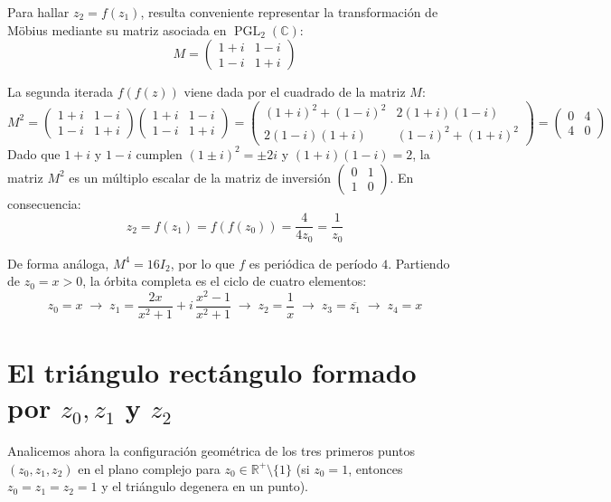 \documentclass[11pt,a4paper]{article}
\theoremstyle{plain}
\theoremstyle{definition}
\begin{document}
Para hallar $z_2 = f(z_1)$, resulta conveniente representar la transformación de Möbius mediante su matriz asociada en $\operatorname{PGL}_2(\mathbb{C})$:
\[
M = \begin{pmatrix} 1+i & 1-i \\ 1-i & 1+i \end{pmatrix}
\]

La segunda iterada $f(f(z))$ viene dada por el cuadrado de la matriz $M$:
\[
M^2 = \begin{pmatrix} 1+i & 1-i \\ 1-i & 1+i \end{pmatrix} \begin{pmatrix} 1+i & 1-i \\ 1-i & 1+i \end{pmatrix}
    = \begin{pmatrix} (1+i)^2 + (1-i)^2 & 2(1+i)(1-i) \\ 2(1-i)(1+i) & (1-i)^2 + (1+i)^2 \end{pmatrix}
    = \begin{pmatrix} 0 & 4 \\ 4 & 0 \end{pmatrix}
\]
Dado que $1+i$ y $1-i$ cumplen $(1\pm i)^2 = \pm 2i$ y $(1+i)(1-i) = 2$, la matriz $M^2$ es un múltiplo escalar de la matriz de inversión $\begin{pmatrix} 0 & 1 \\ 1 & 0 \end{pmatrix}$. En consecuencia:
\begin{equation}\label{eq:z2}
z_2 = f(z_1) = f(f(z_0)) = \frac{4}{4z_0} = \frac{1}{z_0}
\end{equation}

De forma análoga, $M^4 = 16 I_2$, por lo que $f$ es periódica de período $4$. Partiendo de $z_0 = x > 0$, la órbita completa es el ciclo de cuatro elementos:
\[
z_0 = x \;\longrightarrow\; z_1 = \frac{2x}{x^2 + 1} + i\,\frac{x^2 - 1}{x^2 + 1} \;\longrightarrow\; z_2 = \frac{1}{x} \;\longrightarrow\; z_3 = \overline{z_1} \;\longrightarrow\; z_4 = x
\]

\section{El triángulo rectángulo formado por \texorpdfstring{$z_0, z_1$ y $z_2$}{z0, z1 y z2}}

Analicemos ahora la configuración geométrica de los tres primeros puntos $(z_0, z_1, z_2)$ en el plano complejo para $z_0 \in \mathbb{R}^+ \setminus \{1\}$ (si $z_0 = 1$, entonces $z_0 = z_1 = z_2 = 1$ y el triángulo degenera en un punto).
\end{document}
